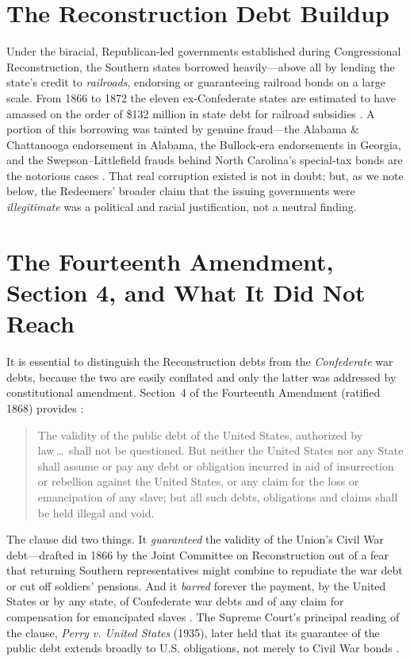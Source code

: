 \documentclass[12pt]{article}
\begin{document}
\section{The Reconstruction Debt Buildup}
\label{sec:buildup}

Under the biracial, Republican-led governments established during Congressional
Reconstruction, the Southern states borrowed heavily---above all by lending the
state's credit to \emph{railroads}, endorsing or guaranteeing railroad bonds on a
large scale. From 1866 to 1872 the eleven ex-Confederate states are estimated to
have amassed on the order of \$132 million in state debt for railroad subsidies
\citep{white2017republic}. A portion of this borrowing was tainted by genuine
fraud---the Alabama \& Chattanooga endorsement in Alabama, the Bullock-era
endorsements in Georgia, and the Swepson--Littlefield frauds behind North
Carolina's special-tax bonds are the notorious cases \citep{scott1893repudiation}.
That real corruption existed is not in doubt; but, as we note below, the Redeemers'
broader claim that the issuing governments were \emph{illegitimate} was a political
and racial justification, not a neutral finding.

\section{The Fourteenth Amendment, Section 4, and What It Did Not Reach}
\label{sec:amend14}

It is essential to distinguish the Reconstruction debts from the \emph{Confederate}
war debts, because the two are easily conflated and only the latter was addressed
by constitutional amendment. Section~4 of the Fourteenth Amendment (ratified 1868)
provides \citep{amend14sec4}:
\begin{quote}
The validity of the public debt of the United States, authorized by law\,\ldots\
shall not be questioned. But neither the United States nor any State shall assume
or pay any debt or obligation incurred in aid of insurrection or rebellion against
the United States, or any claim for the loss or emancipation of any slave; but all
such debts, obligations and claims shall be held illegal and void.
\end{quote}
The clause did two things. It \emph{guaranteed} the validity of the Union's Civil
War debt---drafted in 1866 by the Joint Committee on Reconstruction out of a fear
that returning Southern representatives might combine to repudiate the war debt or
cut off soldiers' pensions. And it \emph{barred} forever the payment, by the United
States or by any state, of Confederate war debts and of any claim for compensation
for emancipated slaves \citep{amend14sec4}. The Supreme Court's principal reading of
the clause, \emph{Perry v. United States} (1935), later held that its guarantee of
the public debt extends broadly to U.S. obligations, not merely to Civil War bonds
\citep{perry1935}.
\end{document}
